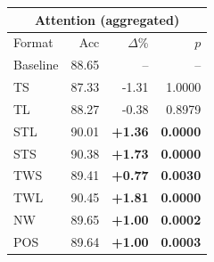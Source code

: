 \begin{tabular}{lrrr}
\toprule
\multicolumn{4}{c}{\textbf{Attention (aggregated)}} \\
\midrule
Format & Acc & $\Delta$\% & $p$ \\
\midrule
Baseline & 88.65 & -- & -- \\
\midrule
TS & 87.33 & -1.31 & 1.0000 \\
TL & 88.27 & -0.38 & 0.8979 \\
STL & 90.01 & \textbf{+1.36} & \textbf{0.0000} \\
STS & 90.38 & \textbf{+1.73} & \textbf{0.0000} \\
TWS & 89.41 & \textbf{+0.77} & \textbf{0.0030} \\
TWL & 90.45 & \textbf{+1.81} & \textbf{0.0000} \\
NW & 89.65 & \textbf{+1.00} & \textbf{0.0002} \\
POS & 89.64 & \textbf{+1.00} & \textbf{0.0003} \\
\bottomrule
\end{tabular}